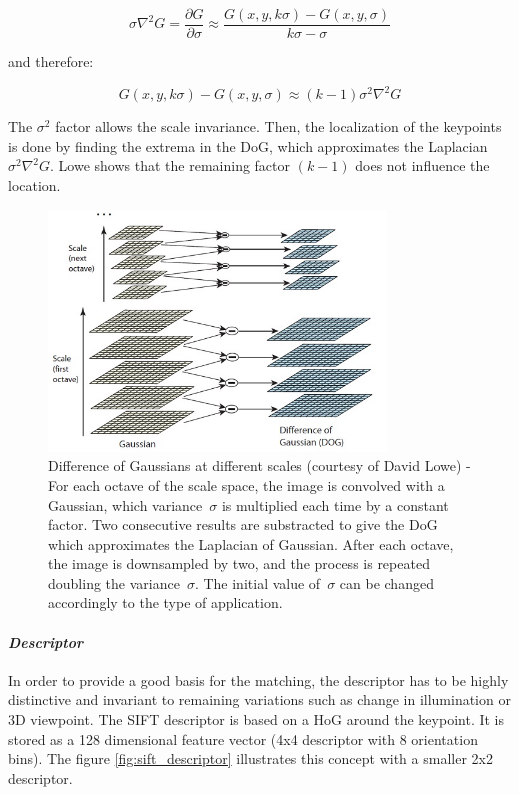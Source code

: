 \[ \sigma\nabla^2G = \frac{\partial G}{\partial \sigma} \approx \frac{G(x,y,k\sigma)-G(x,y,\sigma)}{k\sigma - \sigma} \]

and therefore:

\[ G(x,y,k\sigma) - G(x,y,\sigma) \approx (k-1)\sigma^2\nabla^2G \]

The $\sigma^2$ factor allows the scale invariance. Then, the localization of the keypoints is done by finding the extrema in the \gls{DoG}, which approximates the Laplacian~$\sigma^2\nabla^2G$. Lowe shows that the remaining factor $(k-1)$ does not influence the location. 

\begin{figure}[h]
\centering
\includegraphics[width=0.8\textwidth]{figures/sift_dog}
\caption{Difference of Gaussians at different scales (courtesy of David Lowe) - For each octave of the scale space, the image is convolved with a Gaussian, which variance~$\sigma$ is multiplied each time by a constant factor. Two consecutive results are substracted to give the DoG which approximates the Laplacian of Gaussian. After each octave, the image is downsampled by two, and the process is repeated doubling the variance~$\sigma$. The initial value of~$\sigma$ can be changed accordingly to the type of application. }
\label{fig:sift_dog}
\end{figure}

\paragraph{\emph{Descriptor}}

In order to provide a good basis for the matching, the descriptor has to be highly distinctive and invariant to remaining variations such as change in illumination or 3D viewpoint. The \gls{SIFT} descriptor is based on a \gls{HoG} around the keypoint. It is stored as a 128 dimensional feature vector (4x4 descriptor with 8 orientation bins). The figure \ref{fig:sift_descriptor} illustrates this concept with a smaller 2x2 descriptor.

